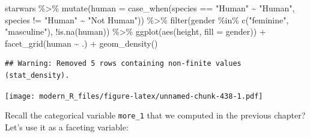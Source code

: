 \documentclass[
]{article}
\newenvironment{Shaded}{\begin{snugshade}}{\end{snugshade}}
\newcommand{\AttributeTok}[1]{\textcolor[rgb]{0.77,0.63,0.00}{#1}}
\newcommand{\FunctionTok}[1]{\textcolor[rgb]{0.00,0.00,0.00}{#1}}
\newcommand{\NormalTok}[1]{#1}
\newcommand{\SpecialCharTok}[1]{\textcolor[rgb]{0.00,0.00,0.00}{#1}}
\newcommand{\StringTok}[1]{\textcolor[rgb]{0.31,0.60,0.02}{#1}}
\begin{document}
\begin{Shaded}
\begin{Highlighting}[]
\NormalTok{starwars }\SpecialCharTok{\%\textgreater{}\%}
  \FunctionTok{mutate}\NormalTok{(}\AttributeTok{human =} \FunctionTok{case\_when}\NormalTok{(species }\SpecialCharTok{==} \StringTok{"Human"} \SpecialCharTok{\textasciitilde{}} \StringTok{"Human"}\NormalTok{,}
\NormalTok{                           species }\SpecialCharTok{!=} \StringTok{"Human"} \SpecialCharTok{\textasciitilde{}} \StringTok{"Not Human"}\NormalTok{)) }\SpecialCharTok{\%\textgreater{}\%}
  \FunctionTok{filter}\NormalTok{(gender }\SpecialCharTok{\%in\%} \FunctionTok{c}\NormalTok{(}\StringTok{"feminine"}\NormalTok{, }\StringTok{"masculine"}\NormalTok{), }\SpecialCharTok{!}\FunctionTok{is.na}\NormalTok{(human)) }\SpecialCharTok{\%\textgreater{}\%}
  \FunctionTok{ggplot}\NormalTok{(}\FunctionTok{aes}\NormalTok{(height, }\AttributeTok{fill =}\NormalTok{ gender)) }\SpecialCharTok{+}
  \FunctionTok{facet\_grid}\NormalTok{(human }\SpecialCharTok{\textasciitilde{}}\NormalTok{ .) }\SpecialCharTok{+}
  \FunctionTok{geom\_density}\NormalTok{()}
\end{Highlighting}
\end{Shaded}

\begin{verbatim}
## Warning: Removed 5 rows containing non-finite values (stat_density).
\end{verbatim}

\texttt{[image: modern\_R\_files/figure-latex/unnamed-chunk-438-1.pdf]}

Recall the categorical variable \texttt{more\_1} that we computed in the previous chapter? Let's use it as
a faceting variable:
\end{document}
